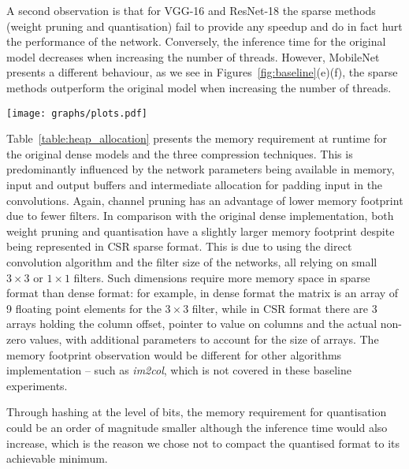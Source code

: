 \documentclass[conference]{IEEEtran}
\begin{document}
A second observation is that for VGG-16 and ResNet-18 the sparse methods (weight pruning and quantisation) fail to provide any speedup and do in fact hurt the performance of the network. Conversely, the inference time for the original model decreases when increasing the number of threads. However, MobileNet presents a different behaviour, as we see in Figures~\ref{fig:baseline}(e)(f), the sparse methods outperform the original model when increasing the number of threads. 

\begin{figure*}[ht]
	\texttt{[image: graphs/plots.pdf]}
    \caption{Baseline experiments comparing the compressed models chosen from obvious elbows on the Pareto curves of accuracy outlined in Table \ref{tab:pareto-points}, benchmarked on the Odroid-XU4 and Intel Core i7 platforms with an increasing thread count.}
  	\label{fig:baseline}
\end{figure*}Table~\ref{table:heap_allocation} presents the memory requirement at runtime for the original dense models and the three compression techniques. This is predominantly influenced by the network parameters being available in memory, input and output buffers and intermediate allocation for padding input in the convolutions. Again, channel pruning has an advantage of lower memory footprint due to fewer filters. In comparison with the original dense implementation, both weight pruning and quantisation have a slightly larger memory footprint despite being represented in CSR sparse format. This is due to using the direct convolution algorithm and the filter size of the networks, all relying on small $3\times3$ or $1\times1$ filters. Such dimensions require more memory space in sparse format than dense format: for example, in dense format the matrix is an array of 9 floating point elements for the $3\times3$ filter, while in CSR format there are 3 arrays holding the column offset, pointer to value on columns and the actual non-zero values, with additional parameters to account for the size of arrays. The memory footprint observation would be different for other algorithms implementation -- such as \textit{im2col}, which is not covered in these baseline experiments.

Through hashing at the level of bits, the memory requirement for quantisation could be an order of magnitude smaller although the inference time would also increase, which is the reason we chose not to compact the quantised format to its achievable minimum. 
\end{document}

